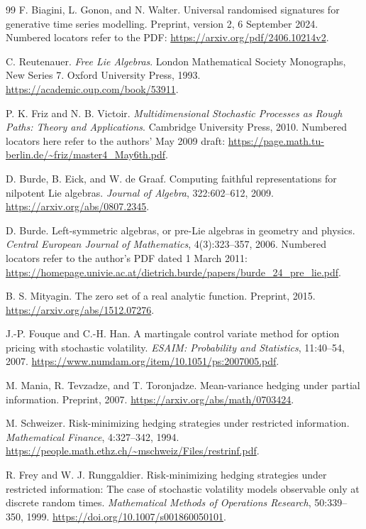 \documentclass[11pt,a4paper]{article}
\numberwithin{equation}{section}
\theoremstyle{definition}
\theoremstyle{remark}
\begin{document}
\begin{thebibliography}{99}
F. Biagini, L. Gonon, and N. Walter.
Universal randomised signatures for generative time series modelling.
Preprint, version 2, 6 September 2024.
Numbered locators refer to the PDF:
\url{https://arxiv.org/pdf/2406.10214v2}.

C. Reutenauer. \emph{Free Lie Algebras}.
London Mathematical Society Monographs, New Series 7.
Oxford University Press, 1993.
\url{https://academic.oup.com/book/53911}.

P. K. Friz and N. B. Victoir.
\emph{Multidimensional Stochastic Processes as Rough Paths: Theory and
Applications}. Cambridge University Press, 2010.
Numbered locators here refer to the authors' May 2009 draft:
\url{https://page.math.tu-berlin.de/~friz/master4_May6th.pdf}.

D. Burde, B. Eick, and W. de Graaf.
Computing faithful representations for nilpotent Lie algebras.
\emph{Journal of Algebra}, 322:602--612, 2009.
\url{https://arxiv.org/abs/0807.2345}.

D. Burde.
Left-symmetric algebras, or pre-Lie algebras in geometry and physics.
\emph{Central European Journal of Mathematics}, 4(3):323--357, 2006.
Numbered locators refer to the author's PDF dated 1 March 2011:
\url{https://homepage.univie.ac.at/dietrich.burde/papers/burde_24_pre_lie.pdf}.

B. S. Mityagin. The zero set of a real analytic function.
Preprint, 2015. \url{https://arxiv.org/abs/1512.07276}.

J.-P. Fouque and C.-H. Han.
A martingale control variate method for option pricing with stochastic
volatility. \emph{ESAIM: Probability and Statistics}, 11:40--54, 2007.
\url{https://www.numdam.org/item/10.1051/ps:2007005.pdf}.

M. Mania, R. Tevzadze, and T. Toronjadze.
Mean-variance hedging under partial information.
Preprint, 2007. \url{https://arxiv.org/abs/math/0703424}.

M. Schweizer. Risk-minimizing hedging strategies under restricted
information. \emph{Mathematical Finance}, 4:327--342, 1994.
\url{https://people.math.ethz.ch/~mschweiz/Files/restrinf.pdf}.

R. Frey and W. J. Runggaldier.
Risk-minimizing hedging strategies under restricted information:
The case of stochastic volatility models observable only at discrete
random times. \emph{Mathematical Methods of Operations Research},
50:339--350, 1999.
\url{https://doi.org/10.1007/s001860050101}.


\end{thebibliography}
\end{document}
